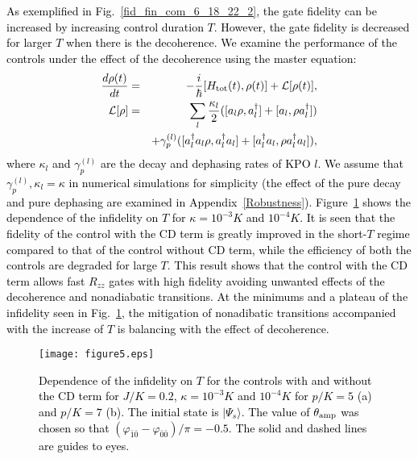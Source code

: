 \documentclass[%
 reprint,
 amsmath,amssymb,
 aps,
pra,
]{revtex4-2}
\begin{document}
\textcolor{black}{
As exemplified in Fig.~\ref{fid_fin_com_6_18_22_2}, the gate fidelity can be increased by increasing control duration $T$.
However, the gate fidelity is decreased  for larger $T$ when there is the decoherence.
We examine the performance of the controls under the effect of the decoherence using the master equation:
\begin{eqnarray}
\frac{d\rho(t)}{dt} &=& -\frac{i}{\hbar}[H_{\rm tot}(t),\rho(t)] + \mathcal{L}[\rho(t)],\nonumber\\
\mathcal{L}[\rho] &=& \sum_l \frac{\kappa_l}{2} ([a_l\rho,a_l^\dagger] + [a_l,\rho a_l^\dagger])\nonumber\\
&&+\gamma_p^{(l)} ([a_l^\dagger a_l\rho,a_l^\dagger a_l] + [a_l^\dagger a_l,\rho a_l^\dagger a_l]), 
\label{ME_6_28_22}
\end{eqnarray}
where $\kappa_l$ and $\gamma_p^{(l)}$ are the decay and dephasing rates of KPO $l$.
We assume that $\gamma_p^{(l)},\kappa_l=\kappa$ in numerical simulations for simplicity (the effect of  the pure decay and pure dephasing are examined in Appendix~\ref{Robustness}).
Figure~\ref{fid_fin_com_kappa_6_18_22} shows the dependence of the infidelity on $T$ for $\kappa=10^{-3}K$ and $10^{-4}K$.
It is seen that the fidelity of the control with the CD term is greatly improved in the short-$T$ regime compared to that of the control without CD term, while the efficiency of both the controls are degraded for large $T$.
This result shows that the control with the CD term allows fast $R_{zz}$ gates with high fidelity avoiding unwanted effects of the decoherence and nonadiabatic transitions.
}
\textcolor{black}{
At the minimums and a plateau of the infidelity seen in Fig.~\ref{fid_fin_com_kappa_6_18_22}, the mitigation of nonadibatic transitions 
accompanied with the increase of $T$ is balancing with the effect of decoherence.
}

\begin{figure}[h!]
\begin{center}
\texttt{[image: figure5.eps]}
\end{center}
\caption{
\textcolor{black}{
Dependence of the infidelity on $T$ for the controls with and without the CD term 
for $J/K=0.2$, $\kappa=10^{-3}K$ and $10^{-4}K$ for $p/K=5$ (a) and  $p/K=7$ (b).
The initial state is $|\Psi_s\rangle$.
The value of  $\theta_{\rm amp}$ was chosen so that  $(\varphi_{\bar{1}\bar{0}} - \varphi_{\bar{0}\bar{0}})/\pi=-0.5$.
The solid and dashed lines are guides to eyes.
}
}
\label{fid_fin_com_kappa_6_18_22}
\end{figure}
\end{document}
